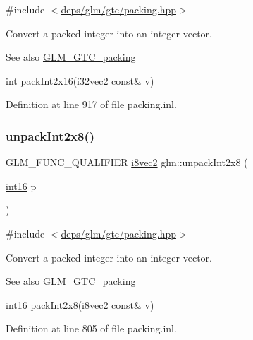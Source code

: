 {\ttfamily \#include $<$\hyperlink{gtc_2packing_8hpp}{deps/glm/gtc/packing.\+hpp}$>$}

Convert a packed integer into an integer vector.

\begin{DoxySeeAlso}{See also}
\hyperlink{group__gtc__packing}{G\+L\+M\+\_\+\+G\+T\+C\+\_\+packing} 

int pack\+Int2x16(i32vec2 const\& v) 
\end{DoxySeeAlso}


Definition at line 917 of file packing.\+inl.

\mbox{\label{group__gtc__packing_ga55b4670bffab6ddb39d4a0fbf98718c1}} 
\subsubsection{\texorpdfstring{unpack\+Int2x8()}{unpackInt2x8()}}
{\footnotesize\ttfamily G\+L\+M\+\_\+\+F\+U\+N\+C\+\_\+\+Q\+U\+A\+L\+I\+F\+I\+ER \hyperlink{group__gtc__type__precision_gade57e4b55fe2b2345a4f2ac2b149cd32}{i8vec2} glm\+::unpack\+Int2x8 (\begin{DoxyParamCaption}\item[{\hyperlink{group__gtc__type__precision_ga2945a61d12771f8954994fcddf02b021}{int16}}]{p }\end{DoxyParamCaption})}



{\ttfamily \#include $<$\hyperlink{gtc_2packing_8hpp}{deps/glm/gtc/packing.\+hpp}$>$}

Convert a packed integer into an integer vector.

\begin{DoxySeeAlso}{See also}
\hyperlink{group__gtc__packing}{G\+L\+M\+\_\+\+G\+T\+C\+\_\+packing} 

int16 pack\+Int2x8(i8vec2 const\& v) 
\end{DoxySeeAlso}


Definition at line 805 of file packing.\+inl.

\mbox{\label{group__gtc__packing_ga625619888b95299a1ee0d9e50469c482}} 
